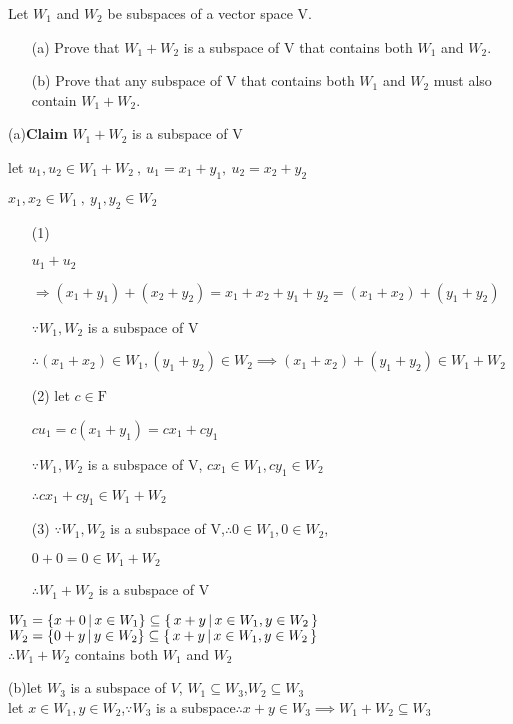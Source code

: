 Let $W_1$ and $W_2$ be subspaces of a vector space $\mathrm{V}$.

\begin{enumerate}
	\item[(a)] Prove that $W_1 + W_2$ is a subspace of $\mathrm{V}$ that contains both $W_1$ and $W_2$. 
	\item[(b)] Prove that any subspace of $\mathrm{V}$ that contains both $W_1$ and $W_2$ must also contain $W_1 + W_2$.
\end{enumerate}

\begin{tcolorbox}
	\begin{solution}
		$ $\\
		(a)\textbf{Claim} $W_1+W_2$ is a subspace of V
		
			let $u_1,u_2 \in W_1 + W_2~,~u_1 = x_1 + y_1,~u_2 = x_2 + y_2$
			
			$x_1, x_2 \in W_1~,~ y_1,y_2 \in W_2$			
			
		\begin{enumerate}
			\item[(1)] 

			$u_1 + u_2 $			
			
			$\Rightarrow (x_1+y_1)+(x_2+y_2) = x_1 +x_2 + y_1+ y_2 = (x_1 +x_2) + (y_1+ y_2)$
			
			$\because W_1,W_2$ is a subspace of V
			
			$\therefore (x_1+x_2) \in W_1 , (y_1+y_2) \in W_2 \implies (x_1 + x_2)+(y_1+y_2) \in W_1 + W_2$
			
			\item[(2)] let $c \in \mathrm{F}$
			
			$cu_1 = c(x_1+y_1) = cx_1+cy_1$
			
			$\because W_1,W_2$ is a subspace of V, $cx_1 \in W_1, cy_1 \in W_2 $
			
			$\therefore cx_1+cy_1 \in W_1 + W_2$
			
			\item[(3)] $\because W_1, W_2$ is a subspace of V,$\therefore 0\in W_1, 0 \in W_2,$
			
			$0+0 = 0 \in W_1 + W_2$
			
			$\therefore W_1+W_2$ is a subspace of V
		\end{enumerate}
		
		$W_1 = \{x+0 \,|\, x \in W_1\} \subseteq \left\{ \,x+y \,|\, x \in W_1 , y \in W_2 \,\right\}$\\
		$W_2 = \{0+y \,|\, y \in W_2\} \subseteq \left\{ \,x+y \,|\, x \in W_1 , y \in W_2 \,\right\}$\\
		$\therefore W_1 + W_2$ contains both $W_1$ and $W_2$
		
		(b)let $W_3$ is a subspace of $V$,
		$W_1 \subseteq W_3$,$W_2 \subseteq W_3$\\
		
		let $x \in W_1, y \in W_2$,$\because W_3$ is a subspace$\therefore x+y \in W_3 \implies W_1 + W_2 \subseteq W_3$
	\end{solution}	
\end{tcolorbox}

